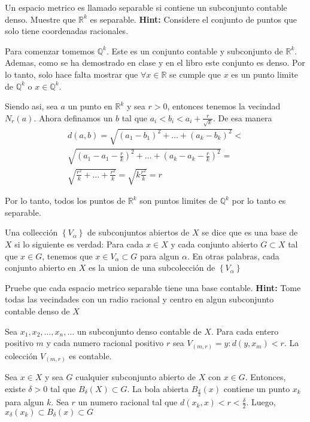 \documentclass[12pt]{article}
\newenvironment{ex}[2][Ejercicio]{\begin{trivlist}
\item[\hskip \labelsep {\bfseries #1}\hskip \labelsep {\bfseries #2.}]}{\end{trivlist}}
\newenvironment{sol}[1][Solución]{\begin{trivlist}
\item[\hskip \labelsep {\bfseries #1:}]}{\end{trivlist}}
\begin{document}
\begin{ex}{2.22}
	Un espacio metrico es llamado separable si contiene un subconjunto contable denso. Muestre que $\mathbb{R}^k$ es separable. \textbf{Hint:} Considere el conjunto de puntos que solo tiene coordenadas racionales.
\end{ex}
\begin{sol}
	Para comenzar tomemos $\mathbb{Q}^k$. Este es un conjunto contable y subconjunto de $\mathbb{R}^k$. Ademas, como se ha demostrado en clase y en el libro este conjunto es denso. Por lo tanto, solo hace falta mostrar que $\forall x \in \mathbb{R}$ se cumple que $x$ es un punto limite de $\mathbb{Q}^k$ o $x \in \mathbb{Q}^k$.

	Siendo asi, sea $a$ un punto en $\mathbb{R}^k$ y sea $r > 0$, entonces tenemos la vecindad $N_r(a)$. Ahora definamos un $b$ tal que $a_i<b_i<a_i + \frac{r}{\sqrt{k}}$. De esa manera
	\begin{align*}
		d(a,b) = \sqrt{(a_1 - b_1)^2 + \ldots + (a_k - b_k)^2} <\\
		\sqrt{(a_1 - a_1 - \frac{r}{k})^2 + \ldots + (a_k - a_k - \frac{r}{k})^2} = \\
		\sqrt{\frac{r^2}{k} + \ldots + \frac{r^2}{k}} = \sqrt{k\frac{r^2}{k}} = r
	\end{align*}

	Por lo tanto, todos los puntos de $\mathbb{R}^k$ son puntos limites de $\mathbb{Q}^k$ por lo tanto es separable.
\end{sol}
\begin{ex}{2.23}
	Una collección $\left\{V_\alpha\right\}$ de subconjuntos abiertos de $X$ se dice que es una base de $X$ si lo siguiente es verdad: Para cada $x\in X$ y cada conjunto abierto $G \subset X$ tal que $x\in G$, tenemos que $x \in V_\alpha \subset G$ para algun $\alpha$. En otras palabras, cada conjunto abierto en $X$ es la union de una subcolección de $\left\{V_\alpha\right\}$

	Pruebe que cada espacio metrico separable tiene una base contable. \textbf{Hint:} Tome todas las vecindades con un radio racional y centro en algun subconjunto contable denso de $X$
\end{ex}
\begin{sol}
	Sea $x_1, x_2, \ldots, x_n, \ldots$ un subconjunto denso contable de $X$. Para cada entero positivo $m$ y cada numero racional positivo $r$ sea $V_{(m,r)}=y:d(y,x_m) < r$. La colección $V_{(m,r)}$ es contable.

	Sea $x\in X$ y sea $G$ cualquier subconjunto abierto de $X$ con $x\in G$. Entonces, existe $\delta > 0$ tal que $B_{\delta}(X) \subset G $. La bola abierta $B_{\frac{\delta}{2}}(x)$ contiene un punto $x_k$ para algun $k$. Sea $r$ un numero racional tal que $d(x_k, x)<r<\frac{\delta}{2}$. Luego, $x_\delta(x_k)\subset B_{\delta}(x)\subset G$
\end{sol}
\end{document}
